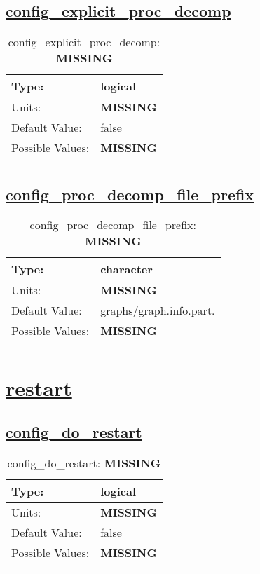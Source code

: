 \subsection[config\_explicit\_proc\_decomp]{\hyperref[sec:nm_tab_decomposition]{config\_explicit\_proc\_decomp}}
\label{subsec:nm_sec_config_explicit_proc_decomp}
\begin{center}
\begin{longtable}{| p{2.0in} || p{4.0in} |}
    \hline
    Type: & logical \\
    \hline
    Units: & {\bf \color{red} MISSING} \\
    \hline
    Default Value: & false \\
    \hline
    Possible Values: & {\bf \color{red} MISSING} \\
    \hline
    \caption{config\_explicit\_proc\_decomp: {\bf \color{red} MISSING}}
\end{longtable}
\end{center}
\subsection[config\_proc\_decomp\_file\_prefix]{\hyperref[sec:nm_tab_decomposition]{config\_proc\_decomp\_file\_prefix}}
\label{subsec:nm_sec_config_proc_decomp_file_prefix}
\begin{center}
\begin{longtable}{| p{2.0in} || p{4.0in} |}
    \hline
    Type: & character \\
    \hline
    Units: & {\bf \color{red} MISSING} \\
    \hline
    Default Value: & graphs/graph.info.part. \\
    \hline
    Possible Values: & {\bf \color{red} MISSING} \\
    \hline
    \caption{config\_proc\_decomp\_file\_prefix: {\bf \color{red} MISSING}}
\end{longtable}
\end{center}
\section[restart]{\hyperref[sec:nm_tab_restart]{restart}}
\label{sec:nm_sec_restart}
\subsection[config\_do\_restart]{\hyperref[sec:nm_tab_restart]{config\_do\_restart}}
\label{subsec:nm_sec_config_do_restart}
\begin{center}
\begin{longtable}{| p{2.0in} || p{4.0in} |}
    \hline
    Type: & logical \\
    \hline
    Units: & {\bf \color{red} MISSING} \\
    \hline
    Default Value: & false \\
    \hline
    Possible Values: & {\bf \color{red} MISSING} \\
    \hline
    \caption{config\_do\_restart: {\bf \color{red} MISSING}}
\end{longtable}
\end{center}
